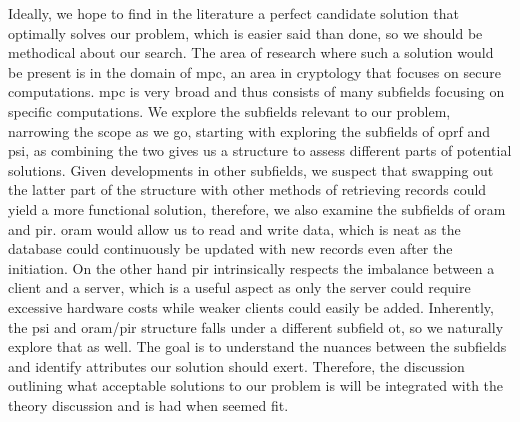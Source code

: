 Ideally, we hope to find in the literature a perfect candidate solution that optimally solves our problem, which is easier said than done, so we should be methodical about our search. The area of research where such a solution would be present is in the domain of \acrshort{mpc}, an area in cryptology that focuses on secure computations. \acrshort{mpc} is very broad and thus consists of many subfields focusing on specific computations. We explore the subfields relevant to our problem, narrowing the scope as we go, starting with exploring the subfields of \acrfull{oprf} and \acrfull{psi}, as combining the two gives us a structure to assess different parts of potential solutions. Given developments in other subfields, we suspect that swapping out the latter part of the structure with other methods of retrieving records could yield a more functional solution, therefore, we also examine the subfields of \acrfull{oram} and \acrshort{pir}. \acrshort{oram} would allow us to read and write data, which is neat as the database could continuously be updated with new records even after the initiation. On the other hand \acrshort{pir} intrinsically respects the imbalance between a client and a server, which is a useful aspect as only the server could require excessive hardware costs while weaker clients could easily be added. Inherently, the \acrshort{psi} and \acrshort{oram}/\acrshort{pir} structure falls under a different subfield \acrshort{ot}, so we naturally explore that as well. The goal is to understand the nuances between the subfields and identify attributes our solution should exert. Therefore, the discussion outlining what acceptable solutions to our problem is will be integrated with the theory discussion and is had when seemed fit.
